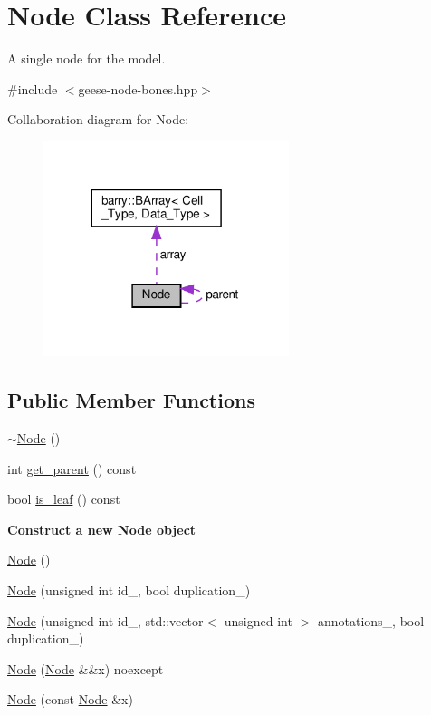 \hypertarget{class_node}{}\section{Node Class Reference}
\label{class_node}


A single node for the model.  




{\ttfamily \#include $<$geese-\/node-\/bones.\+hpp$>$}



Collaboration diagram for Node\+:\nopagebreak
\begin{figure}[H]
\begin{center}
\leavevmode
\includegraphics[width=203pt]{class_node__coll__graph}
\end{center}
\end{figure}
\subsection*{Public Member Functions}
\begin{DoxyCompactItemize}
\item 
\hyperlink{class_node_aa0840c3cb5c7159be6d992adecd2097c}{$\sim$\+Node} ()
\item 
int \hyperlink{class_node_a661cb63a33e950b84c9c093c63d1ab63}{get\+\_\+parent} () const
\item 
bool \hyperlink{class_node_af7cc2d0f435e3bee4388a0e9ab42adb8}{is\+\_\+leaf} () const
\end{DoxyCompactItemize}
\begin{Indent}\textbf{ Construct a new Node object}\par
\begin{DoxyCompactItemize}
\item 
\hyperlink{class_node_ad7a34779cad45d997bfd6d3d8043c75f}{Node} ()
\item 
\hyperlink{class_node_affbe0c59bdcfd5e8068d50b49742cff6}{Node} (unsigned int id\+\_\+, bool duplication\+\_\+)
\item 
\hyperlink{class_node_a05edab5d06fba5a71443399343645553}{Node} (unsigned int id\+\_\+, std\+::vector$<$ unsigned int $>$ annotations\+\_\+, bool duplication\+\_\+)
\item 
\hyperlink{class_node_a7541702bb12f9dae3f6cbf83bddaed2a}{Node} (\hyperlink{class_node}{Node} \&\&x) noexcept
\item 
\hyperlink{class_node_ac9e4a04860b442c2034e24aa058db129}{Node} (const \hyperlink{class_node}{Node} \&x)
\end{DoxyCompactItemize}
\end{Indent}
